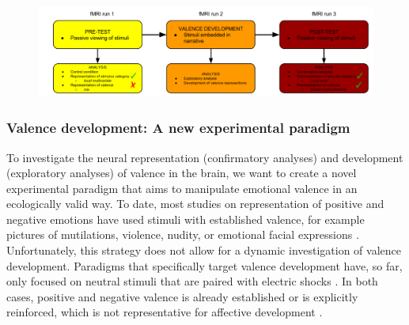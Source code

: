 \documentclass[12pt,a4paper]{article}\usepackage[]{graphicx}\usepackage[]{color}
\begin{document}
\begin{figure}[h]
\centering
\includegraphics[scale=.45]{runs_exp}
\end{figure}

\subsubsection{Valence development: A new experimental paradigm}
To investigate the neural representation (confirmatory analyses) and development (exploratory analyses) of valence in the brain, we want to create a novel experimental paradigm that aims to manipulate emotional valence in an ecologically valid way. To date, most studies on representation of positive and negative emotions have used stimuli with established valence, for example pictures of mutilations, violence, nudity, or emotional facial expressions \citep{lang1999,goeleven2008,KDEF}. Unfortunately, this strategy does not allow for a dynamic investigation of valence development. Paradigms that specifically target valence development have, so far, only focused on neutral stimuli that are paired with electric shocks \citep{visser2013,padmala2008}. In both cases, positive and negative valence is already established or is explicitly reinforced, which is not representative for affective development \citep{barrett2011}.
\end{document}
